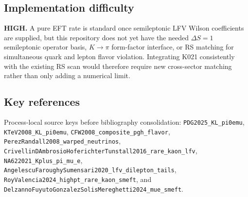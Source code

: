 \subsection*{Implementation difficulty}
\textbf{HIGH.}  A pure EFT rate is standard once semileptonic LFV Wilson
coefficients are supplied, but this repository does not yet have the needed
\(\Delta S=1\) semileptonic operator basis, \(K\to\pi\) form-factor interface,
or RS matching for simultaneous quark and lepton flavor violation.  Integrating
K021 consistently with the existing RS scan would therefore require new
cross-sector matching rather than only adding a numerical limit.

\subsection*{Key references}
Process-local source keys before bibliography consolidation:
\texttt{PDG2025\_KL\_pi0emu},
\texttt{KTeV2008\_KL\_pi0emu},
\texttt{CFW2008\_composite\_pgh\_flavor},
\texttt{PerezRandall2008\_warped\_neutrinos},
\texttt{CrivellinDAmbrosioHoferichterTunstall2016\_rare\_kaon\_lfv},
\texttt{NA622021\_Kplus\_pi\_mu\_e},
\texttt{AngelescuFaroughySumensari2020\_lfv\_dilepton\_tails},
\texttt{RoyValencia2024\_highpt\_rare\_kaon\_smeft}, and
\texttt{DelzannoFuyutoGonzalezSolisMereghetti2024\_mue\_smeft}.
